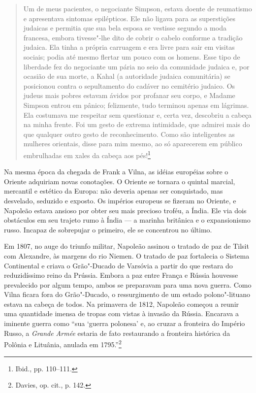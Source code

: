 \begin{quote}
Um de meus pacientes, o negociante Simpson, estava doente de reumatismo
e apresentava sintomas epilépticos. Ele não ligava para as superstições
judaicas e permitia que sua bela esposa se vestisse segundo a moda
francesa, embora tivesse"-lhe dito de cobrir o cabelo conforme a tradição
judaica. Ela tinha a própria carruagem e era livre para sair em visitas
sociais; podia até mesmo flertar um pouco com os homens. Esse tipo de
liberdade fez do negociante um pária no seio da comunidade judaica e,
por ocasião de sua morte, a Kahal (a autoridade judaica comunitária) se
posicionou contra o sepultamento do cadáver no cemitério judaico. Os
judeus mais pobres estavam ávidos por profanar seu corpo, e Madame
Simpson entrou em pânico; felizmente, tudo terminou apenas em lágrimas.
Ela costumava me respeitar sem questionar e, certa vez, descobriu a
cabeça na minha frente. Foi um gesto de extrema intimidade, que admirei
mais do que qualquer outro gesto de reconhecimento. Como são
inteligentes as mulheres orientais, disse para mim mesmo, ao só
aparecerem em público embrulhadas em xales da cabeça aos pés!\footnote{Ibid.,
  pp. 110--111.}
  \end{quote}

Na mesma época da chegada de Frank a Vilna, as idéias européias sobre o
Oriente adquiriam novas conotações. O Oriente se tornara o quintal
marcial, mercantil e estético da Europa: não deveria apenas ser
conquistado, mas desvelado, seduzido e exposto. Os impérios europeus se
fizeram no Oriente, e Napoleão estava ansioso por obter seu mais
precioso troféu, a Índia. Ele via dois obstáculos em seu trajeto rumo à
Índia --- a marinha britânica e o expansionismo russo. Incapaz de
sobrepujar o primeiro, ele se concentrou no último.

Em 1807, no auge do triunfo militar, Napoleão assinou o tratado de paz
de Tilsit com Alexandre, às margens do rio Niemen. O tratado de paz
fortalecia o Sistema Continental e criava o Grão"-Ducado de Varsóvia a
partir do que restara do reduzidíssimo reino da Prússia. Embora a paz
entre França e Rússia houvesse prevalecido por algum tempo, ambos se
preparavam para uma nova guerra. Como Vilna ficara fora do Grão"-Ducado,
o ressurgimento de um estado polono"-lituano estava na cabeça de todos.
Na primavera de 1812, Napoleão começou a reunir uma quantidade imensa de
tropas com vistas à invasão da Rússia. Encarava a iminente guerra como
``sua `guerra polonesa' e, ao cruzar a fronteira do Império Russo, a
\emph{Grande Armée} estaria de fato restaurando a fronteira histórica da
Polônia e Lituânia, anulada em 1795.''\footnote{Davies, op. cit., p.
  142.}

